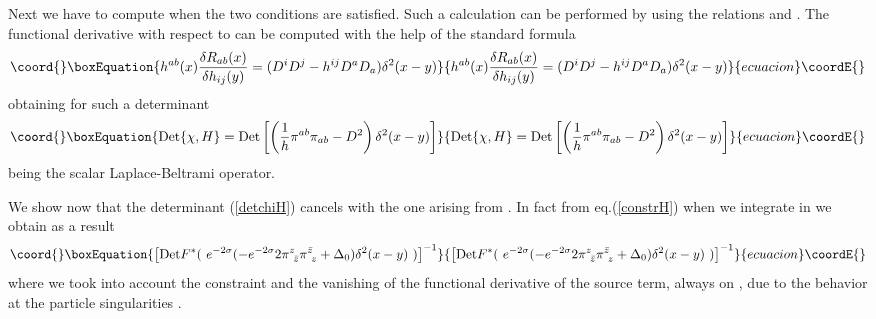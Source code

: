 \documentclass[a4paper,12pt]{article}
\begin{document}
Next we have to compute \coordHE{} when the two conditions \coordHE{}
are satisfied. Such a calculation can be performed by using the
relations \coordHE{}
and \coordHE{}. The
functional derivative with respect to \coordHE{} can be computed with
the help of the standard formula \cite{wald}
\begin{equation}\coord{}\boxEquation{
h^{ab}(x)\frac{\delta R_{ab}(x)}{\delta h_{ij}(y)}=
(D^iD^j-h^{ij}D^aD_a)\delta^2(x-y)
}{
h^{ab}(x)\frac{\delta R_{ab}(x)}{\delta h_{ij}(y)}=
(D^iD^j-h^{ij}D^aD_a)\delta^2(x-y)
}{ecuacion}\coordE{}\end{equation}
obtaining for such a determinant 
\begin{equation}\coord{}\boxEquation{\label{detchiH}
{\rm Det}\{\chi,H\}={\rm
Det}\left[\left(\frac{1}{h}\pi^{ab}\pi_{ab}-D^2\right)\delta^2(x-y)\right]
}{{\rm Det}\{\chi,H\}={\rm
Det}\left[\left(\frac{1}{h}\pi^{ab}\pi_{ab}-D^2\right)\delta^2(x-y)\right]
}{ecuacion}\coordE{}\end{equation}
being \coordHE{} the scalar Laplace-Beltrami operator.

We show now that the determinant (\ref{detchiH}) cancels with the one
arising from \coordHE{}. In fact from
eq.(\ref{constrH}) when we integrate \coordHE{} in
\coordHE{} we obtain as a result
\begin{equation}\coord{}\boxEquation{
\left[{\rm Det}F^*(~e^{-2\sigma}(-e^{-2\sigma}2\pi^z_{~\bar z}\pi^{\bar
z}_{~z}+\Delta_0)\delta^2(x-y)~)\right]^{-1}
}{
\left[{\rm Det}F^*(~e^{-2\sigma}(-e^{-2\sigma}2\pi^z_{~\bar z}\pi^{\bar
z}_{~z}+\Delta_0)\delta^2(x-y)~)\right]^{-1}
}{ecuacion}\coordE{}\end{equation}
where we took into account the constraint \coordHE{} and
the vanishing of the functional derivative of the source term, always
on \coordHE{}, due to the behavior \coordHE{} at the particle singularities \cite{MS}. 
\end{document}
